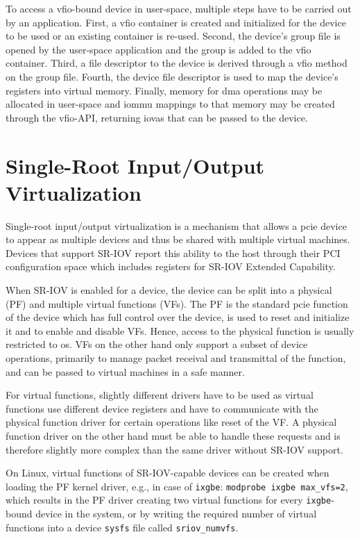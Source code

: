 To access a \ac{vfio}-bound device in user-space, multiple steps have to be
carried out by an application. First, a \ac{vfio} container is created and
initialized for the device to be used or an existing container is re-used.
Second, the device's group file is opened by the user-space application and the
group is added to the \ac{vfio} container. Third, a file descriptor to the
device is derived through a \ac{vfio} method on the group file. Fourth, the
device file descriptor is used to map the device's registers into virtual
memory. Finally, memory for \ac{dma} operations may be allocated in user-space
and \ac{iommu} mappings to that memory may be created through the \ac{vfio}-API,
returning \acp{iova} that can be passed to the device.


\section{Single-Root Input/Output Virtualization}
\label{sec:sriov}

Single-root input/output virtualization is a mechanism that allows a \ac{pcie}
device to appear as multiple devices and thus be shared with multiple virtual
machines. Devices that support SR-IOV report this ability to the host through
their PCI configuration space which includes registers for SR-IOV Extended
Capability.

When SR-IOV is enabled for a device, the device can be split into a physical
(PF) and multiple virtual functions (VFs). The PF is the standard \ac{pcie}
function of the device which has full control over the device, is used to reset
and initialize it and to enable and disable VFs. Hence, access to the physical
function is usually restricted to \ac{os}. VFs on the other hand only support a
subset of device operations, primarily to manage packet receival and transmittal
of the function, and can be passed to virtual machines in a safe manner.

For virtual functions, slightly different drivers have to be used as virtual
functions use different device registers and have to communicate with the
physical function driver for certain operations like reset of the VF. A physical
function driver on the other hand must be able to handle these requests and is
therefore slightly more complex than the same driver without SR-IOV support.

On Linux, virtual functions of SR-IOV-capable devices can be created when
loading the PF kernel driver, e.g., in case of \texttt{ixgbe}: \texttt{modprobe
ixgbe max\_vfs=2}, which results in the PF driver creating two virtual functions
for every \texttt{ixgbe}-bound device in the system, or by writing the required
number of virtual functions into a device \texttt{sysfs} file called
\texttt{sriov\_numvfs}.

